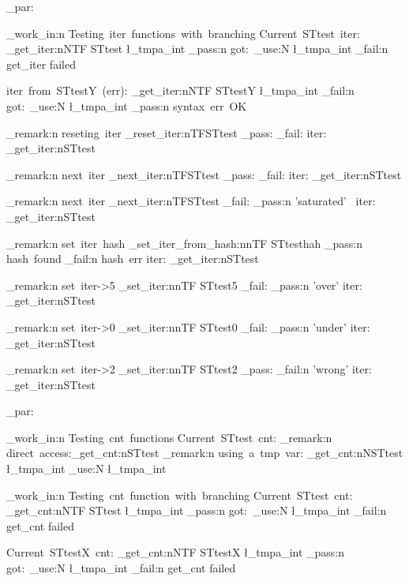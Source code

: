 \documentclass{article}
\begin{document}
\sttests_par:

\sttests_work_in:n {Testing~iter~functions~with~branching}
Current~STtest~iter: 
\starray_get_iter:nNTF {STtest} \l_tmpa_int 
  {\sttests_pass:n {got:~\int_use:N \l_tmpa_int}}
  {\sttests_fail:n {get_iter failed}}

iter~from~STtestY~(err): 
\starray_get_iter:nNTF {STtestY} \l_tmpa_int 
  {\sttests_fail:n {got:~\int_use:N \l_tmpa_int}}
  {\sttests_pass:n {syntax~err~OK}}

\sttests_remark:n {reseting~iter} 
\starray_reset_iter:nTF{STtest}
  {\sttests_pass:}
  {\sttests_fail:}
iter: \starray_get_iter:n{STtest}

\sttests_remark:n {next~iter} 
\starray_next_iter:nTF{STtest}
  {\sttests_pass:}
  {\sttests_fail:}
iter: \starray_get_iter:n{STtest}

\sttests_remark:n {next~iter} 
\starray_next_iter:nTF{STtest}
  {\sttests_fail:}
  {\sttests_pass:n {'saturated'}~}
iter: \starray_get_iter:n{STtest}

\sttests_remark:n {set~iter~hash} 
\starray_set_iter_from_hash:nnTF {STtest}{hah}
  {\sttests_pass:n {hash~found}}
  {\sttests_fail:n {hash~err}}
iter: \starray_get_iter:n{STtest}

\sttests_remark:n {set~iter->5} 
\starray_set_iter:nnTF {STtest}{5}
  {\sttests_fail:}
  {\sttests_pass:n {'over'}}
iter: \starray_get_iter:n{STtest}

\sttests_remark:n {set~iter->0} 
\starray_set_iter:nnTF {STtest}{0}
  {\sttests_fail:}
  {\sttests_pass:n {'under'}}
iter: \starray_get_iter:n{STtest}

\sttests_remark:n {set~iter->2} 
\starray_set_iter:nnTF {STtest}{2}
  {\sttests_pass:}
  {\sttests_fail:n {'wrong'}}
iter: \starray_get_iter:n{STtest}

\sttests_par:

\sttests_work_in:n {Testing~cnt~functions}
Current~STtest~cnt: 
\sttests_remark:n {direct~access:\starray_get_cnt:n{STtest}}
\sttests_remark:n {using~a~tmp~var: \starray_get_cnt:nN{STtest} \l_tmpa_int \int_use:N \l_tmpa_int}

\sttests_work_in:n {Testing~cnt~function~with~branching}
Current~STtest~cnt: 
\starray_get_cnt:nNTF {STtest} \l_tmpa_int 
  {\sttests_pass:n {got:~\int_use:N \l_tmpa_int}}
  {\sttests_fail:n {get_cnt failed}}

Current~STtestX~cnt: 
\starray_get_cnt:nNTF {STtestX} \l_tmpa_int 
  {\sttests_pass:n {got:~\int_use:N \l_tmpa_int}}
  {\sttests_fail:n {get_cnt failed}}
\end{document}
